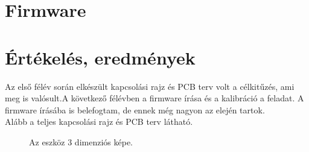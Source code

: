 \documentclass[a4paper, 12pt]{article}
\newcommand{\tab}{\hspace*{1em}}
\begin{document}
\section{Firmware}

\section{Értékelés, eredmények}
\tab Az első félév során elkészült kapcsolási rajz és PCB terv volt a célkitűzés, ami meg is valósult.A következő félévben a firmware írása és a kalibráció  a feladat. A firmware írásába is belefogtam, de ennek még nagyon az elején tartok.\\
Alább a teljes kapcsolási rajz és PCB terv látható.








\begin{figure}[H]
    \centering
    \caption{Az eszköz 3 dimenziós képe.}
\end{figure}
\clearpage




\vspace{1cm}
\end{document}
